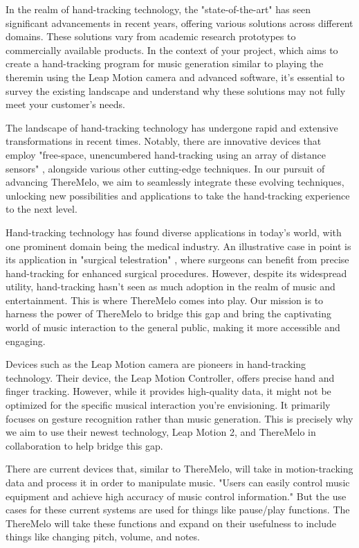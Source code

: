 
In the realm of hand-tracking technology, the "state-of-the-art" has seen significant advancements in recent years, offering various solutions across different domains. These solutions vary from academic research prototypes to commercially available products. In the context of your project, which aims to create a hand-tracking program for music generation similar to playing the theremin using the Leap Motion camera and advanced software, it's essential to survey the existing landscape and understand why these solutions may not fully meet your customer's needs.

The landscape of hand-tracking technology has undergone rapid and extensive transformations in recent times. Notably, there are innovative devices that employ "free-space, unencumbered hand-tracking using an array of distance sensors" \cite{Chronopoulos2021}, alongside various other cutting-edge techniques. In our pursuit of advancing ThereMelo, we aim to seamlessly integrate these evolving techniques, unlocking new possibilities and applications to take the hand-tracking experience to the next level.

Hand-tracking technology has found diverse applications in today's world, with one prominent domain being the medical industry. An illustrative case in point is its application in "surgical telestration" \cite{Muller2022}, where surgeons can benefit from precise hand-tracking for enhanced surgical procedures. However, despite its widespread utility, hand-tracking hasn't seen as much adoption in the realm of music and entertainment. This is where ThereMelo comes into play. Our mission is to harness the power of ThereMelo to bridge this gap and bring the captivating world of music interaction to the general public, making it more accessible and engaging.

Devices such as the Leap Motion camera \cite{Vysocky2020} are pioneers in hand-tracking technology. Their device, the Leap Motion Controller, offers precise hand and finger tracking. However, while it provides high-quality data, it might not be optimized for the specific musical interaction you're envisioning. It primarily focuses on gesture recognition rather than music generation. This is precisely why we aim to use their newest technology, Leap Motion 2, and ThereMelo in collaboration to help bridge this gap.

There are current devices that, similar to ThereMelo, will take in motion-tracking data and process it in order to manipulate music. "Users can easily
control music equipment and achieve high accuracy of music control information." \cite{Pan2021} But the use cases for these current systems are used for things like pause/play functions. The ThereMelo will take these functions and expand on their usefulness to include things like changing pitch, volume, and notes.

